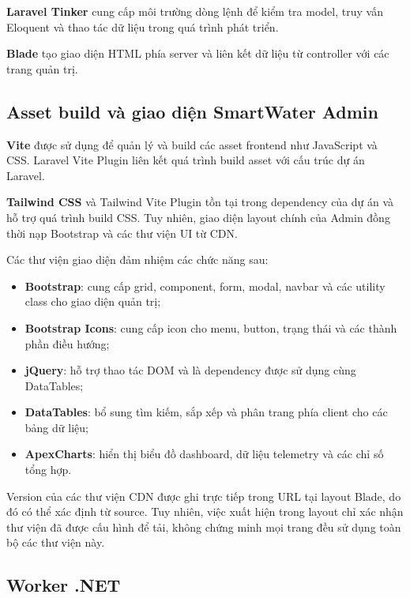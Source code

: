 \textbf{Laravel Tinker} cung cấp môi trường dòng lệnh để kiểm tra model, truy
vấn Eloquent và thao tác dữ liệu trong quá trình phát triển.

\textbf{Blade} tạo giao diện HTML phía server và liên kết dữ liệu từ controller
với các trang quản trị.

\subsection{Asset build và giao diện SmartWater Admin}

\textbf{Vite} được sử dụng để quản lý và build các asset frontend như JavaScript
và CSS. Laravel Vite Plugin liên kết quá trình build asset với cấu trúc dự án
Laravel.

\textbf{Tailwind CSS} và Tailwind Vite Plugin tồn tại trong dependency của dự
án và hỗ trợ quá trình build CSS. Tuy nhiên, giao diện layout chính của Admin
đồng thời nạp Bootstrap và các thư viện UI từ CDN.

Các thư viện giao diện đảm nhiệm các chức năng sau:

\begin{itemize}
    \item \textbf{Bootstrap}: cung cấp grid, component, form, modal, navbar và
    các utility class cho giao diện quản trị;

    \item \textbf{Bootstrap Icons}: cung cấp icon cho menu, button, trạng thái
    và các thành phần điều hướng;

    \item \textbf{jQuery}: hỗ trợ thao tác DOM và là dependency được sử dụng
    cùng DataTables;

    \item \textbf{DataTables}: bổ sung tìm kiếm, sắp xếp và phân trang phía
    client cho các bảng dữ liệu;

    \item \textbf{ApexCharts}: hiển thị biểu đồ dashboard, dữ liệu telemetry
    và các chỉ số tổng hợp.
\end{itemize}

Version của các thư viện CDN được ghi trực tiếp trong URL tại layout Blade, do
đó có thể xác định từ source. Tuy nhiên, việc xuất hiện trong layout chỉ xác
nhận thư viện đã được cấu hình để tải, không chứng minh mọi trang đều sử dụng
toàn bộ các thư viện này.

\subsection{Worker .NET}

